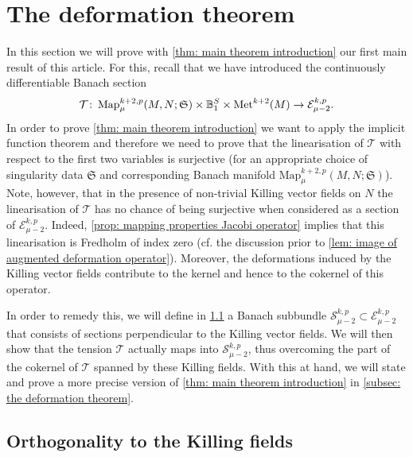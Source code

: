 \documentclass{article}
\numberwithin{equation}{section}        %
\theoremstyle{bfnote}
\theoremstyle{definition}
\theoremstyle{bfremark}
\newcommand{\col}{\colon \thinspace}        %
\newcommand{\Ball}{\mathbb{B}}              %
\newcommand{\Map}{\mathrm{Map}}             %
\newcommand{\Met}{\mathrm{Met}}             %
\begin{document}
    \section{The deformation theorem}       \label{sec: The deformation theorem}

In this section we will prove with \cref{thm: main theorem introduction} our first main result of this article. For this, recall that we have introduced the continuously differentiable Banach section 
\begin{equation*}
    \mathcal{T} \col \Map^{k+2,p}_{\mu}(M,N;\mathfrak{S}) \times \Ball_1^S \times \Met^{k+2}(M) \to \mathcal{E}^{k,p}_{\mu-2}.
\end{equation*}
In order to prove \cref{thm: main theorem introduction} we want to apply the implicit function theorem and therefore we need to prove that the linearisation of $\mathcal{T}$ with respect to the first two variables is surjective (for an appropriate choice of singularity data $\mathfrak{S}$ and corresponding Banach manifold $\Map^{k+2,p}_{\mu}(M,N;\mathfrak{S})$). Note, however, that in the presence of non-trivial Killing vector fields on $N$ the linearisation of $\mathcal{T}$ has no chance of being surjective when considered as a section of $\mathcal{E}^{k,p}_{\mu-2}$. Indeed, \cref{prop: mapping properties Jacobi operator} implies that this linearisation is Fredholm of index zero (cf. the discussion prior to \cref{lem: image of augmented deformation operator}). Moreover, the deformations induced by the Killing vector fields contribute to the kernel and hence to the cokernel of this operator.

In order to remedy this, we will define in \cref{subsec: the tension revisited} a Banach subbundle $\mathcal{S}^{k,p}_{\mu-2} \subset \mathcal{E}^{k,p}_{\mu-2}$ that consists of sections perpendicular to the Killing vector fields. We will then show that the tension $\mathcal{T}$ actually maps into $\mathcal{S}^{k,p}_{\mu-2}$, thus overcoming the part of the cokernel of $\mathcal{T}$ spanned by these Killing fields. With this at hand, we will state and prove a more precise version of \cref{thm: main theorem introduction} in \cref{subsec: the deformation theorem}.


    \subsection{Orthogonality to the Killing fields}      \label{subsec: the tension revisited}
\end{document}
